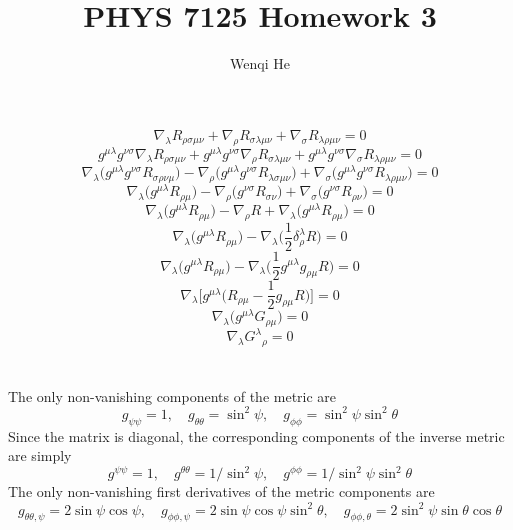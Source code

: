 \documentclass{article}
\title{PHYS 7125 Homework 3}
\author{Wenqi He}
\begin{document}
\maketitle
\section{}
\[ \nabla_\lambda R_{\rho\sigma\mu\nu} + \nabla_\rho R_{\sigma\lambda\mu\nu} + \nabla_\sigma R_{\lambda\rho\mu\nu} = 0 \]
\[ g^{\mu\lambda} g^{\nu\sigma}\nabla_\lambda R_{\rho\sigma\mu\nu} + g^{\mu\lambda} g^{\nu\sigma} \nabla_\rho R_{\sigma\lambda\mu\nu} + g^{\mu\lambda} g^{\nu\sigma} \nabla_\sigma R_{\lambda\rho\mu\nu} = 0 \]
\[ \nabla_\lambda \Big(g^{\mu\lambda} g^{\nu\sigma} R_{\sigma\rho\nu\mu}\Big) - \nabla_\rho \Big(g^{\mu\lambda} g^{\nu\sigma}  R_{\lambda\sigma\mu\nu}\Big) + \nabla_\sigma \Big(g^{\mu\lambda} g^{\nu\sigma} R_{\lambda\rho\mu\nu}\Big) = 0 \]
\[ \nabla_\lambda \Big(g^{\mu\lambda} R_{\rho\mu}\Big) - \nabla_\rho \Big( g^{\nu\sigma}  R_{\sigma\nu}\Big) + \nabla_\sigma \Big( g^{\nu\sigma} R_{\rho\nu}\Big) = 0 \]
\[ \nabla_\lambda \Big(g^{\mu\lambda} R_{\rho\mu}\Big) - \nabla_\rho R+ \nabla_\lambda\Big( g^{\mu\lambda} R_{\rho\mu}\Big) = 0 \]
\[ \nabla_\lambda \Big(g^{\mu\lambda} R_{\rho\mu}\Big) - \nabla_\lambda \Big( \frac{1}{2}\delta_\rho^\lambda R\Big)  = 0 \]
\[ \nabla_\lambda \Big(g^{\mu\lambda} R_{\rho\mu}\Big) - \nabla_\lambda \Big (\frac{1}{2} g^{\mu\lambda}g_{\rho\mu} R\Big)  = 0 \]
\[  \nabla_\lambda  \Big[ g^{\mu\lambda} \Big(  R_{\rho\mu} - \frac{1}{2} g_{\rho\mu} R\Big) \Big]  = 0 \]
\[  \nabla_\lambda  \Big( g^{\mu\lambda} G_{\rho\mu} \Big)  = 0 \]
\[  \nabla_\lambda  G^\lambda{}_\rho  = 0 \]

\section{}
The only non-vanishing components of the metric are 
\[ g_{\psi\psi} = 1, \quad  g_{\theta\theta}= \sin^2\psi, \quad g_{\phi\phi} = \sin^2\psi \sin^2\theta\]
Since the matrix is diagonal, the corresponding components of the inverse metric are simply
\[ g^{\psi\psi} = 1, \quad  g^{\theta\theta} = 1/\sin^2\psi, \quad g^{\phi\phi} = 1/\sin^2\psi \sin^2\theta\]
The only non-vanishing first derivatives of the metric components are
\[ g_{\theta\theta,\psi} = 2\sin\psi\cos\psi, \quad g_{\phi\phi,\psi} = 2\sin\psi\cos\psi\sin^2\theta,
	\quad g_{\phi\phi,\theta} = 2\sin^2\psi \sin\theta\cos\theta \]
\end{document}
